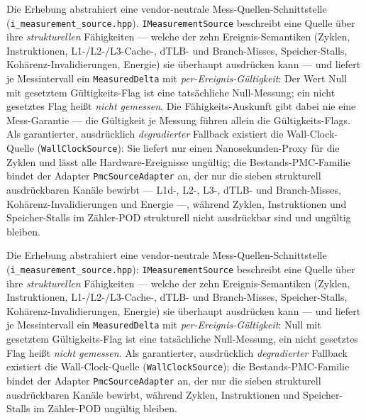 \begin{nurlang}
Die Erhebung abstrahiert eine vendor-neutrale Mess-Quellen-Schnittstelle
(\texttt{i\_\allowbreak{}measurement\_\allowbreak{}source.hpp}). \texttt{IMeasurementSource} beschreibt eine Quelle über ihre
\emph{strukturellen} Fähigkeiten --- welche der zehn Ereignis-Semantiken (Zyklen, Instruktionen,
L1-/L2-/L3-Cache-, dTLB- und Branch-Misses, Speicher-Stalls, Kohärenz-Invalidierungen, Energie) sie
überhaupt ausdrücken kann --- und liefert je Messintervall ein \texttt{MeasuredDelta} mit
\emph{per-Ereignis-Gültigkeit}: Der Wert Null mit gesetztem Gültigkeits-Flag ist eine tatsächliche
Null-Messung; ein nicht gesetztes Flag heißt \emph{nicht gemessen}. Die Fähigkeits-Auskunft gibt
dabei nie eine Mess-Garantie --- die Gültigkeit je Messung führen allein die Gültigkeits-Flags. Als
garantierter, ausdrücklich \emph{degradierter} Fallback existiert die Wall-Clock-Quelle
(\texttt{WallClockSource}): Sie liefert nur einen Nanosekunden-Proxy für die Zyklen und lässt alle
Hardware-Ereignisse ungültig; die Bestands-PMC-Familie bindet der Adapter \texttt{PmcSourceAdapter}
an, der nur die sieben strukturell ausdrückbaren Kanäle bewirbt --- L1d-, L2-, L3-, dTLB- und
Branch-Misses, Kohärenz-Invalidierungen und Energie ---, während Zyklen, Instruktionen und
Speicher-Stalls im Zähler-POD strukturell nicht ausdrückbar sind und ungültig bleiben.
\end{nurlang}
\begin{nurkurz}
Die Erhebung abstrahiert eine vendor-neutrale Mess-Quellen-Schnittstelle
(\texttt{i\_\allowbreak{}measurement\_\allowbreak{}source.hpp}): \texttt{IMeasurementSource} beschreibt
eine Quelle über ihre \emph{strukturellen} Fähigkeiten --- welche der zehn Ereignis-Semantiken (Zyklen,
Instruktionen, L1-/L2-/L3-Cache-, dTLB- und Branch-Misses, Speicher-Stalls, Kohärenz-Invalidierungen,
Energie) sie überhaupt ausdrücken kann --- und liefert je Messintervall ein \texttt{MeasuredDelta} mit
\emph{per-Ereignis-Gültigkeit}: Null mit gesetztem Gültigkeits-Flag ist eine tatsächliche Null-Messung,
ein nicht gesetztes Flag heißt \emph{nicht gemessen}. Als garantierter, ausdrücklich \emph{degradierter}
Fallback existiert die Wall-Clock-Quelle (\texttt{WallClockSource}); die Bestands-PMC-Familie bindet der
Adapter \texttt{PmcSourceAdapter} an, der nur die sieben strukturell ausdrückbaren Kanäle bewirbt, während
Zyklen, Instruktionen und Speicher-Stalls im Zähler-POD ungültig bleiben.
\end{nurkurz}

